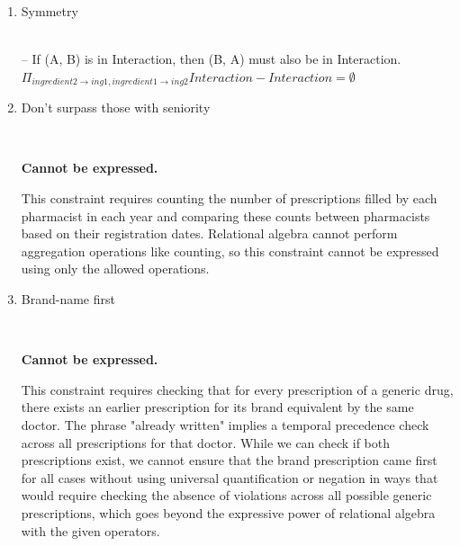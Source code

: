 \documentclass{article}
\newcommand{\var}[1]{\mathit{#1}}
\begin{document}
\begin{enumerate}

\item   %
{Symmetry}

{~}\\
{\small
-- If (A, B) is in Interaction, then (B, A) must also be in Interaction. \\[5pt]
$
\Pi_{\var{ingredient2} \rightarrow \var{ing1}, \var{ingredient1} \rightarrow \var{ing2}} 
\var{Interaction} - \var{Interaction} = \emptyset
$
}


\item   %
{Don't surpass those with seniority}

{~}\\
{\small
\textbf{Cannot be expressed.}

\vspace{5pt}
This constraint requires counting the number of prescriptions filled by each pharmacist in each year and comparing these counts between pharmacists based on their registration dates. Relational algebra cannot perform aggregation operations like counting, so this constraint cannot be expressed using only the allowed operations.
}


\item   %
{Brand-name first}

{~}\\
{\small
\textbf{Cannot be expressed.}

\vspace{5pt}
This constraint requires checking that for every prescription of a generic drug, there exists an earlier prescription for its brand equivalent by the same doctor. The phrase "already written" implies a temporal precedence check across all prescriptions for that doctor. While we can check if both prescriptions exist, we cannot ensure that the brand prescription came first for all cases without using universal quantification or negation in ways that would require checking the absence of violations across all possible generic prescriptions, which goes beyond the expressive power of relational algebra with the given operators.
}

\end{enumerate}
\end{document}
